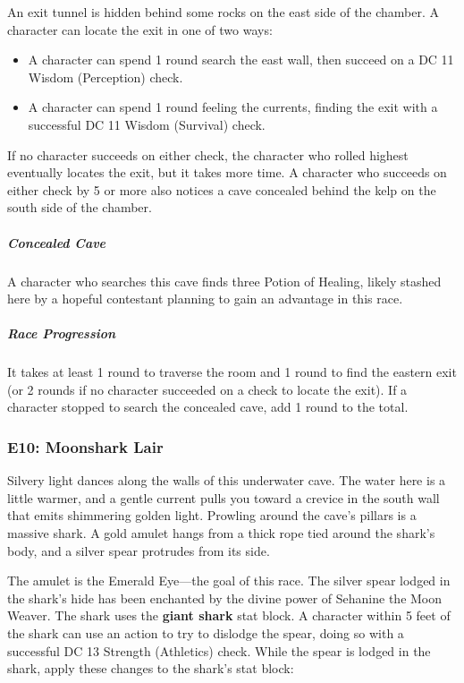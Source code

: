 \documentclass[10pt,a4paper,twoside,fancy,bg=print,twocolumn,openany,nodeprecatedcode]{dndbook}
\begin{document}
An exit tunnel is hidden behind some rocks on the east side of the chamber. A character can locate the exit in one of two ways:


\begin{itemize}
\item A character can spend 1 round search the east wall, then succeed on a DC 11 Wisdom (Perception) check.
\item A character can spend 1 round feeling the currents, finding the exit with a successful DC 11 Wisdom (Survival) check.
\end{itemize}

If no character succeeds on either check, the character who rolled highest eventually locates the exit, but it takes more time. A character who succeeds on either check by 5 or more also notices a cave concealed behind the kelp on the south side of the chamber.

\subparagraph{Concealed Cave}
A character who searches this cave finds three Potion of Healing, likely stashed here by a hopeful contestant planning to gain an advantage in this race.

\subparagraph{Race Progression}
It takes at least 1 round to traverse the room and 1 round to find the eastern exit (or 2 rounds if no character succeeded on a check to locate the exit). If a character stopped to search the concealed cave, add 1 round to the total.

\subsubsection{E10: Moonshark Lair}
\begin{DndReadAloud}{}
Silvery light dances along the walls of this underwater cave. The water here is a little warmer, and a gentle current pulls you toward a crevice in the south wall that emits shimmering golden light. Prowling around the cave's pillars is a massive shark. A gold amulet hangs from a thick rope tied around the shark's body, and a silver spear protrudes from its side.

\end{DndReadAloud}

The amulet is the Emerald Eye—the goal of this race. The silver spear lodged in the shark's hide has been enchanted by the divine power of Sehanine the Moon Weaver. The shark uses the \textbf{giant shark} stat block. A character within 5 feet of the shark can use an action to try to dislodge the spear, doing so with a successful DC 13 Strength (Athletics) check. While the spear is lodged in the shark, apply these changes to the shark's stat block:
\end{document}

